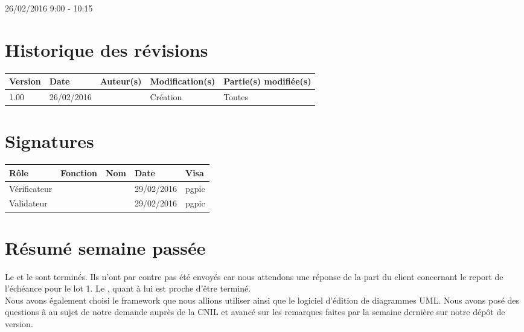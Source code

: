 \documentclass [a4paper] {article}
\begin{document}
26/02/2016			 				%
\hfill   
\hfill 	 9:00 - 10:15 				%


\section*{Historique des révisions}
\begin{center}
			\begin{tabular}{| p{2.5cm} | p{3cm} | p{3cm} | p{3cm} | p{3.5cm} |}
				\hline
				\rowcolor{Gray}
				Version & Date & Auteur(s) & Modification(s) & Partie(s) modifiée(s)		 \\
				\hline
				1.00 & 26/02/2016 & \Pierre & Création & Toutes \\
		\hline		
			\end{tabular}
		\end{center}

\section*{Signatures}

		\begin{center}
			\begin{tabular}{| p{2.5cm} | p{4cm} | p{3cm} | p{3cm} | p{2.5cm} |}
				\hline
				\rowcolor{Gray}
				Rôle & Fonction & Nom & Date & Visa		 \\
				\hline
				Vérificateur & \RGC & \Mathieu & 29/02/2016 & pgpic \\[30pt]
				\hline
				Validateur & \CP & \Sergi & 29/02/2016 & pgpic \\[30pt]	
				\hline
			\end{tabular}
		\end{center}


\section{Résumé semaine passée}
Le \DSE{} et le \PTV{} sont terminés. Ils n'ont par contre pas été envoyés car nous attendons une réponse de la part du client concernant le report de l'échéance pour le lot 1. Le \DSI{}, quant à lui est proche d'être terminé.
\\
Nous avons également choisi le framework que nous allions utiliser ainsi que le logiciel d'édition de diagrammes UML. Nous avons posé des questions à \nomTuteurQualite{} au sujet de notre demande auprès de la CNIL et avancé sur les remarques faites par \nomTuteurPedago{} la semaine dernière sur notre dépôt de version.
\end{document}
